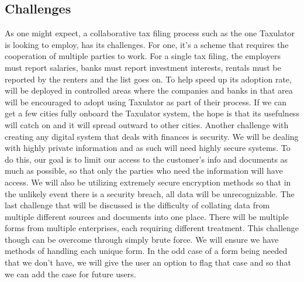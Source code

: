 \documentclass[sigconf]{acmart}
\begin{document}
\subsection{Challenges}
As one might expect, a collaborative tax filing process such as the one Taxulator is looking to employ, has its challenges. For one, it’s a scheme that requires the cooperation of multiple parties to work. For a single tax filing, the employers must report salaries, banks must report investment interests, rentals must be reported by the renters and the list goes on. To help speed up its adoption rate, will be deployed in controlled areas where the companies and banks in that area will be encouraged to adopt using Taxulator as part of their process. If we can get a few cities fully onboard the Taxulator system, the hope is that its usefulness will catch on and it will spread outward to other cities.
Another challenge with creating any digital system that deals with finances is security. We will be dealing with highly private information and as such will need highly secure systems. To do this, our goal is to limit our access to the customer’s info and documents as much as possible, so that only the parties who need the information will have access. We will also be utilizing extremely secure encryption methods so that in the unlikely event there is a security breach, all data will be unrecognizable.
The last challenge that will be discussed is the difficulty of collating data from multiple different sources and documents into one place. There will be multiple forms from multiple enterprises, each requiring different treatment. This challenge though can be overcome through simply brute force. We will ensure we have methods of handling each unique form. In the odd case of a form being needed that we don’t have, we will give the user an option to flag that case and so that we can add the case for future users.
\end{document}
